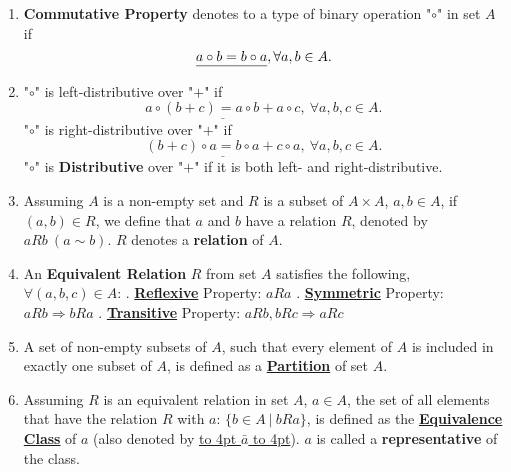 \documentclass[12pt]{scrartcl}
\begin{document}
{{\begin{enumerate}[label=(\alph*)]
	\item \textbf{Commutative Property} denotes to a type of binary operation "$\circ$" in set $A$ if $$\underline{a \circ b = b \circ a\vphantom{,}}, \forall a, b \in A.$$
	\vspace{0.3em}

	\item "$\circ$" is left-distributive over "$+$" if $$\underline{a \circ (b + c) = a \circ b + a \circ c}, ~\forall a, b, c \in A.$$
	"$\circ$" is right-distributive over "$+$" if $$\underline{(b + c) \circ a = b \circ a + c \circ a}, ~\forall a, b, c \in A.$$
	"$\circ$" is \textbf{Distributive} over "$+$" if it is both left- and right-distributive. 
	\newpage
	\item \begin{spacing}{1.2}Assuming $A$ is a non-empty set and $R$ is a subset of $A \times A$, $a, b \in A$, if $(a, b) \in R$, we define that $a$ and $b$ have a relation $R$, denoted by \underline{$aRb ~ (a \sim b)$}. $R$ denotes a \textbf{relation} of $A$. \end{spacing}

	\item An \textbf{Equivalent Relation} $R$ from set $A$ satisfies the following, $\forall (a, b, c) \in A$:
		. \underline{\textbf{Reflexive}\vphantom{,}}  Property: \underline{$aRa$\vphantom{,}}		
		. \underline{\textbf{Symmetric}}  Property: \underline{$aRb \Rightarrow bRa$\vphantom{,}}
		. \underline{\textbf{Transitive}\vphantom{,}}  Property: \underline{$aRb, bRc \Rightarrow aRc$} \\

	\item \begin{spacing}{1.2}A set of non-empty subsets of $A$, such that every element of $A$ is included in exactly one subset of $A$, is defined as a \underline{\textbf{Partition}} of set $A$. \end{spacing}
	\vspace{0.5em}

	\item \begin{spacing}{1.2}Assuming $R$ is an equivalent relation in set $A$, $a \in A$, the set of all elements that have the relation $R$ with $a$: $\{b \in A ~ | ~ bRa\}$, is defined as the \underline{\textbf{Equivalence Class}} of $a$ (also denoted by \underline{\hbox to 4pt{} $\bar{a}$ \hbox to 4pt{}}\vphantom{,}). $a$ is called a \textbf{representative} of the class. \end{spacing}
	\vspace{0.5em}


\end{enumerate}}}
\end{document}
